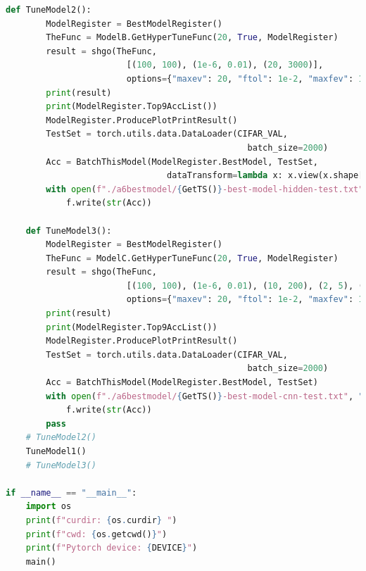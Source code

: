 \documentclass[]{article}
\begin{document}
\begin{lstlisting}[language=python]
    def TuneModel2():
        ModelRegister = BestModelRegister()
        TheFunc = ModelB.GetHyperTuneFunc(20, True, ModelRegister)
        result = shgo(TheFunc,
                        [(100, 100), (1e-6, 0.01), (20, 3000)],
                        options={"maxev": 20, "ftol": 1e-2, "maxfev": 10})
        print(result)
        print(ModelRegister.Top9AccList())
        ModelRegister.ProducePlotPrintResult()
        TestSet = torch.utils.data.DataLoader(CIFAR_VAL,
                                                batch_size=2000)
        Acc = BatchThisModel(ModelRegister.BestModel, TestSet,
                                dataTransform=lambda x: x.view(x.shape[0], -1))
        with open(f"./a6bestmodel/{GetTS()}-best-model-hidden-test.txt", "w+") as f:
            f.write(str(Acc))

    def TuneModel3():
        ModelRegister = BestModelRegister()
        TheFunc = ModelC.GetHyperTuneFunc(20, True, ModelRegister)
        result = shgo(TheFunc,
                        [(100, 100), (1e-6, 0.01), (10, 200), (2, 5), (2, 4)],
                        options={"maxev": 20, "ftol": 1e-2, "maxfev": 10})
        print(result)
        print(ModelRegister.Top9AccList())
        ModelRegister.ProducePlotPrintResult()
        TestSet = torch.utils.data.DataLoader(CIFAR_VAL,
                                                batch_size=2000)
        Acc = BatchThisModel(ModelRegister.BestModel, TestSet)
        with open(f"./a6bestmodel/{GetTS()}-best-model-cnn-test.txt", "w+") as f:
            f.write(str(Acc))
        pass
    # TuneModel2()
    TuneModel1()
    # TuneModel3()

if __name__ == "__main__":
    import os
    print(f"curdir: {os.curdir} ")
    print(f"cwd: {os.getcwd()}")
    print(f"Pytorch device: {DEVICE}")
    main()            
        \end{lstlisting}
\end{document}
